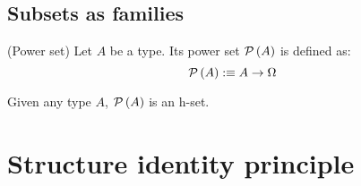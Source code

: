\subsection{Subsets as families}

\begin{defn}(Power set)
  Let $A$ be a type. Its power set $\mathcal{P}\left(A\right)$ is defined as:
  \begin{equation*}
    \mathcal{P}\left(A\right) :\equiv A \rightarrow \Omega
  \end{equation*}
\end{defn}

\begin{prop}\label{isSetPow}
  Given any type $A$, $\mathcal{P}\left(A\right)$ is an h-set.
\end{prop}

\section{Structure identity principle}
